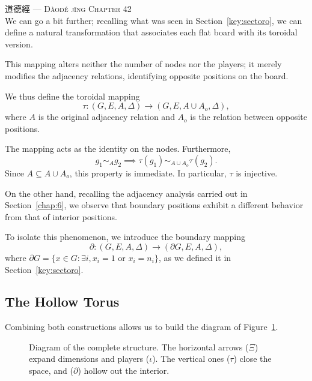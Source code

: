 \vspace{1pt}
\hfill  道德經 — {\textsc{Dàodé jīng Chapter 42}}\\

We can go a bit further; recalling what was seen in Section~\ref{key:sectoro}, we can define a natural transformation that associates each flat board with its toroidal version.

This mapping alters neither the number of nodes nor the players; it merely modifies the adjacency relations, identifying opposite positions on the board.

We thus define the toroidal mapping
$$\tau:(G,E,A,\Delta)\to(G,E,A\cup A_o,\Delta),$$
where $A$ is the original adjacency relation and $A_o$ is the relation between opposite positions.

The mapping acts as the identity on the nodes. Furthermore,$$g_1\sim_A g_2\implies\tau(g_1)\sim_{A\cup A_o}\tau(g_2).$$Since $A\subseteq A\cup A_o$, this property is immediate. In particular, $\tau$ is injective.

On the other hand, recalling the adjacency analysis carried out in Section~\ref{chap:6}, we observe that boundary positions exhibit a different behavior from that of interior positions.

To isolate this phenomenon, we introduce the boundary mapping
$$\partial:(G,E,A,\Delta)\to(\partial G,E,A,\Delta),$$
where $\partial G = \{ x \in G : \exists i, x_i = 1 \text{ or } x_i = n_i \}$, as we defined it in Section~\ref{key:sectoro}.

\subsection*{The Hollow Torus}

Combining both constructions allows us to build the diagram of Figure~\ref{fig: torohueco}.

\begin{figure}[H]
	\centering
	\caption{Diagram of the complete structure. The horizontal arrows (\(\Xi\)) expand dimensions and players (\(\iota\)). The vertical ones (\(\tau\)) close the space, and (\(\partial\)) hollow out the interior.}
	\label{fig: torohueco}
\end{figure}

